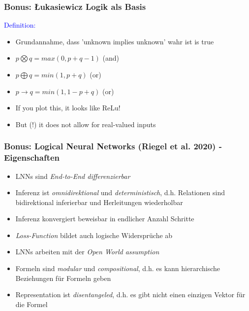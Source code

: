 \documentclass[aspectratio=169]{beamer}
\begin{document}
   


\begin{frame}[fragile]\frametitle{Bonus: Łukasiewicz Logik als Basis}
\textcolor{blue}{Definition:}  
\begin{itemize}
    \item Grundannahme, dass 'unknown implies unknown' wahr ist is true
    \item $p \bigotimes q = max (0,p+q-1)$ (and)
    \item $p \bigoplus q = min (1,p+q)$ (or)
    \item $p \to q = min (1,1-p+q)$ (or)
    \item If you plot this, it looks like ReLu!
    \item But (!) it does not allow for real-valued inputs
\end{itemize}
\end{frame}
 
\begin{frame}\frametitle{Bonus: Logical Neural Networks (Riegel et al. 2020) - Eigenschaften}
\begin{itemize}
    \item LNNs sind \textit{End-to-End differenzierbar} 
    \item Inferenz ist \textit{omnidirektional} und \textit{deterministisch}, d.h. Relationen sind bidirektional inferierbar und Herleitungen wiederholbar
    \item Inferenz konvergiert beweisbar in endlicher Anzahl Schritte
    \item \textit{Loss-Function} bildet auch logische Widersprüche ab
    \item LNNs arbeiten mit der \textit{Open World assumption}%
    \item Formeln sind \textit{modular} und \textit{compositional}, d.h. es kann hierarchische Beziehungen für Formeln geben
    \item Representation ist \textit{disentangeled}, d.h. es gibt nicht einen einzigen Vektor für die Formel
\end{itemize}
\end{frame}
 
\end{document}
